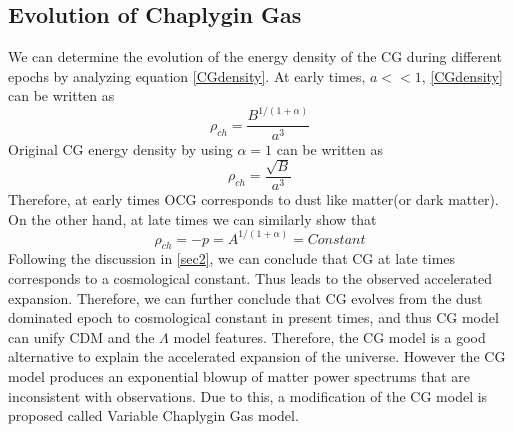 \subsection{Evolution of Chaplygin Gas}
We can determine the evolution of the energy density of the CG during different epochs by analyzing equation \ref{CGdensity}. At early times, $a<<1$, \ref{CGdensity} can be written as 
\begin{equation}
    \rho_{ch}=\frac{B^{1/(1+\alpha)}}{a^3}
\end{equation}
Original CG energy density by using $\alpha=1$ can be written as
\begin{equation}
      \rho_{ch}=\frac{\sqrt{B}}{a^3}
\end{equation}
Therefore, at early times OCG corresponds to dust like matter(or dark matter). On the other hand, at late times we can similarly show that
\begin{equation}
    \rho_{ch}= -p = A^{1/(1+\alpha)} = Constant
\end{equation}
Following the discussion in \ref{sec2}, we can conclude that CG at late times corresponds to a cosmological constant. Thus leads to the observed accelerated expansion. Therefore, we can further conclude that CG evolves from the dust dominated epoch to cosmological constant in present times, and thus CG model can unify CDM and the $\Lambda$ model features. Therefore, the CG model is a good alternative to explain the accelerated expansion of the universe. However the CG model produces an exponential blowup of matter power spectrums that are inconsistent with observations. Due to this, a modification of the CG model is proposed called Variable Chaplygin Gas model.
